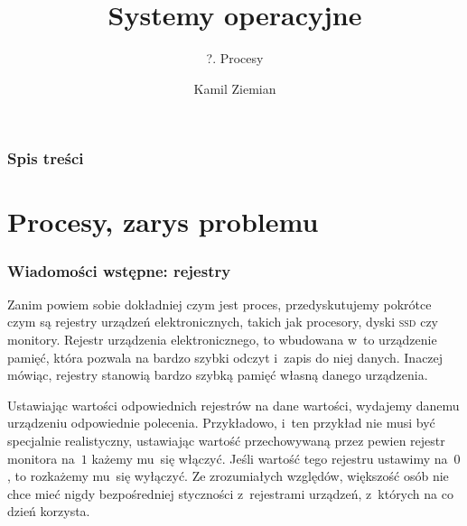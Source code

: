 \documentclass[10pt,t]{beamer}
\title{Systemy operacyjne}
\subtitle{?. Procesy}
\author{Kamil Ziemian \\
  \email}
\begin{document}





\RaggedRight





\maketitle










\begin{frame}
  \frametitle{Spis treści}


  \tableofcontents

\end{frame}





\section{Procesy, zarys problemu}


\begin{frame}
  \frametitle{Wiadomości wstępne: rejestry}


  Zanim powiem sobie dokładniej czym jest proces, przedyskutujemy pokrótce
  czym są rejestry urządzeń elektronicznych, takich jak procesory, dyski
  \textsc{ssd} czy monitory. Rejestr urządzenia elektronicznego, to
  wbudowana w~to urządzenie pamięć, która pozwala na bardzo szybki odczyt
  i~zapis do niej danych. Inaczej mówiąc, rejestry stanowią bardzo szybką
  pamięć własną danego urządzenia.

  Ustawiając wartości odpowiednich rejestrów na dane wartości, wydajemy
  danemu urządzeniu odpowiednie polecenia. Przykładowo, i~ten przykład nie
  musi być specjalnie realistyczny, ustawiając wartość przechowywaną przez
  pewien rejestr monitora na~$1$ każemy mu~się włączyć. Jeśli wartość tego
  rejestru ustawimy na~$0$, to rozkażemy mu~się wyłączyć. Ze zrozumiałych
  względów, większość osób nie chce mieć nigdy bezpośredniej styczności
  z~rejestrami urządzeń, z~których na co dzień korzysta.

\end{frame}
\end{document}
